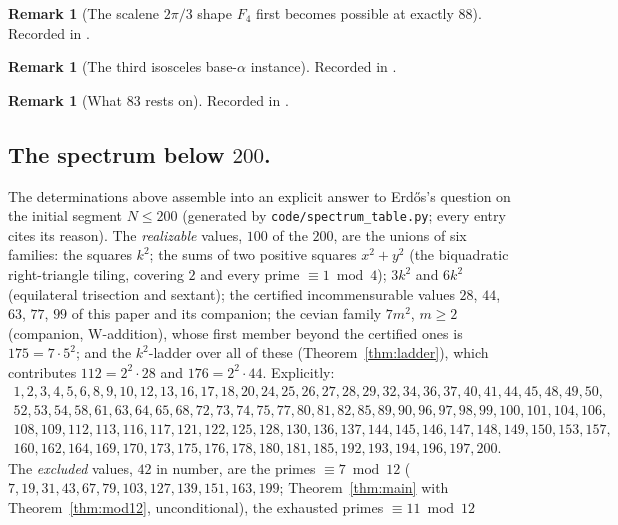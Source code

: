 \documentclass[11pt,reqno]{amsart}
\theoremstyle{plain}
\theoremstyle{definition}
\newtheorem{remark}[theorem]{Remark}
\begin{document}
\begin{remark}[The scalene $2\pi/3$ shape $F_4$ first becomes possible at exactly $88$]\label{rem:F4at88}
Recorded in \cite{Obstructions}.
\end{remark}

\begin{remark}[The third isosceles base-$\alpha$ instance]\label{rem:isoalpha84}
Recorded in \cite{Obstructions}.
\end{remark}

\begin{remark}[What $83$ rests on]\label{rem:eightythree}
Recorded in \cite{Obstructions}.
\end{remark}

\subsection*{The spectrum below $200$.}
The determinations above assemble into an explicit answer to Erd\H{o}s's question on the initial
segment $N\le200$ (generated by \texttt{code/spectrum\_table.py}; every entry cites its reason).
The \emph{realizable} values, $100$ of the $200$, are the unions of six families: the squares
$k^2$; the sums of two positive squares $x^2+y^2$ (the biquadratic right-triangle tiling, covering
$2$ and every prime $\equiv1\bmod4$); $3k^2$ and $6k^2$ (equilateral trisection and sextant);
the certified incommensurable values $28$, $44$, $63$, $77$, $99$ of this paper and its companion;
the cevian family $7m^2$, $m\ge2$ (companion, W-addition), whose first member beyond the
certified ones is $175=7\cdot5^2$; and the $k^2$-ladder over all of these
(Theorem~\ref{thm:ladder}), which contributes $112=2^2\cdot28$ and $176=2^2\cdot44$. Explicitly:
\[
\begin{array}{l}
1,2,3,4,5,6,8,9,10,12,13,16,17,18,20,24,25,26,27,28,29,32,34,36,37,40,41,44,45,48,49,50,\\
52,53,54,58,61,63,64,65,68,72,73,74,75,77,80,81,82,85,89,90,96,97,98,99,100,101,104,106,\\
108,109,112,113,116,117,121,122,125,128,130,136,137,144,145,146,147,148,149,150,153,157,\\
160,162,164,169,170,173,175,176,178,180,181,185,192,193,194,196,197,200.
\end{array}
\]
The \emph{excluded} values, $42$ in number, are the primes $\equiv7\bmod{12}$
($7,19,31,43,67,79,103,127,139,151,163,199$; Theorem~\ref{thm:main} with
Theorem~\ref{thm:mod12}, unconditional), the exhausted primes $\equiv11\bmod{12}$
\end{document}
